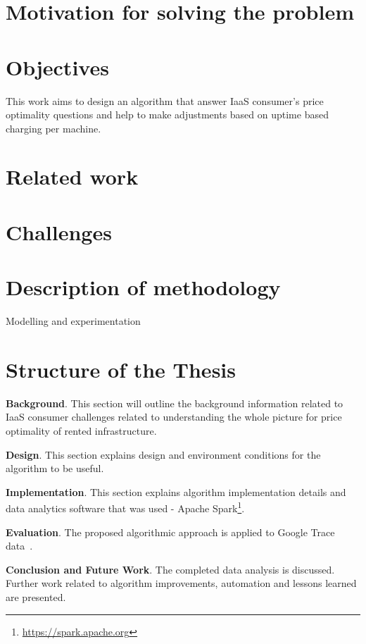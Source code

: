 \documentclass[]{final_report}
\begin{document}
\section{Motivation for solving the problem}

\section{Objectives}
This work aims to design an algorithm that answer IaaS consumer's price optimality questions and help to make adjustments based on uptime based charging per machine. 

\section{Related work}

\section{Challenges}

\section{Description of methodology}
Modelling and experimentation

\section{Structure of the Thesis}
\textbf{Background}. This section will outline the background information related to IaaS consumer challenges related to understanding the whole picture for price optimality of rented infrastructure. \par
\textbf{Design}. This section explains design and environment conditions for the algorithm to be useful. \par
\textbf{Implementation}. This section explains algorithm implementation details and data analytics software that was used - Apache Spark\footnote{\url{https://spark.apache.org}}. \par
\textbf{Evaluation}. The proposed algorithmic approach is applied to Google Trace data~\cite{clusterdata:Reiss2011}. \par
\textbf{Conclusion and Future Work}. The completed data analysis is discussed. Further work related to algorithm improvements, automation and lessons learned are presented. 
 
\newpage

\end{document}
